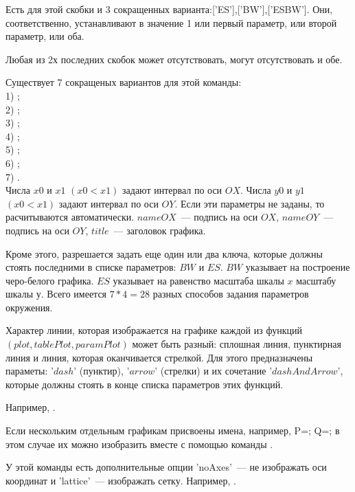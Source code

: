 Есть для этой скобки и 3 сокращенных варианта:['ES'],['BW'],['ESBW'].
Они, соответственно, устанавливают в значение 1 или первый параметр, или второй параметр, или оба.

Любая из 2х последних скобок может отсутствовать, могут отсутствовать и обе.

Существует 7  сокращеных вариантов для этой команды: \\
1) ;\\
2) ; \\
3) ;\\ 
4) ;\\
5) ;\\
6) ;\\ 
7) .\\ 

Числа $x0$ и $x1$ $(x0<x1)$ задают интервал по оси $OX$. Числа $y0$ и $y1$ $(x0<x1)$ задают интервал по оси $OY$. 
Если эти параметры не заданы, то расчитываются автоматически. $nameOX$~--- подпись на оси $OX$, $nameOY$~--- подпись на оси $OY$, $title$~--- заголовок графика.

Кроме этого, разрешается задать еще один или два ключа, которые должны стоять последними в списке параметров:  $BW$ и $ES$. 
$BW$ указывает на построение черо-белого графика. $ES$ указывает на равенство масштаба шкалы $x$ масштабу шкалы $у$. 
Всего имеется $7*4=28$ разных способов задания параметров окружения.

Характер линии, которая изображается на графике каждой из функций
$(plot, tablePlot, paramPlot)$ может быть разный: сплошная линия, пунктирная линия и линия, которая оканчивается стрелкой. 
Для этого предназначены параметы: '$dash$' (пунктир), '$arrow$' (стрелки) и их сочетание '$dashAndArrow$', которые должны стоять  в конце списка параметров этих функций. 

Например, .

Если нескольким отдельным графикам присвоены имена, например, 
P=; Q=; 
в этом случае их можно изобразить вместе с помощью команды .

У этой команды есть дополнительные опции 'noAxes'~--- не изображать оси координат и 'lattice'~--- изображать сетку.
Например, . 


